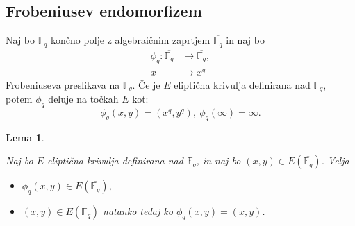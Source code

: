 \documentclass[12pt,a4paper,twoside]{article}
\theoremstyle{definition} %
\theoremstyle{plain} %
\newtheorem{lema}[definicija]{Lema}
\numberwithin{equation}{section}  %
\newcommand{\F}{\mathbb F}
\newcommand{\E}[1]{E({#1})}
\begin{document}
\subsection{Frobeniusev endomorfizem}

Naj bo $\F_q$ končno polje z algebraičnim zaprtjem $\overline{\F_q}$ in naj bo
\begin{align}
\phi_q:\overline{\F_q} &{} \rightarrow \overline{\F_q}, \nonumber \\
x &{} \mapsto x^q \nonumber
\end{align}
Frobeniuseva preslikava na $\F_q$.
Če je $E$ eliptična krivulja definirana nad $\F_q$, potem $\phi_q$ deluje na točkah $E$ kot:
$$\phi_q(x,y) = (x^q,y^q), \ \phi_q(\infty) = \infty.$$

\begin{lema}~

\label{lema:4.5}

Naj bo $E$ eliptična krivulja definirana nad $\F_q$, in naj bo $(x,y) \in \E{\overline{\F_q}}$. Velja
\begin{itemize}

\item $\phi_q(x,y) \in \E{\overline{\F_q}}$,
\item $(x,y) \in \E{\F_q}$ natanko tedaj ko $\phi_q(x,y) = (x,y)$.


\end{itemize}

\end{lema}
\end{document}
